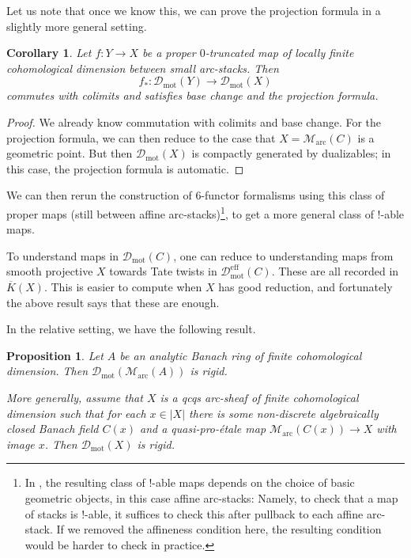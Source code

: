 \documentclass[11pt]{amsart}
\numberwithin{equation}{section}
\numberwithin{theorem}{section}
\newtheorem{corollary}[theorem]{Corollary}
\newtheorem{proposition}[theorem]{Proposition}
\theoremstyle{definition}
\begin{document}
Let us note that once we know this, we can prove the projection formula in a slightly more general setting.

\begin{corollary}\label{cor:generalprojectionformula} Let $f: Y\to X$ be a proper $0$-truncated map of locally finite cohomological dimension between small arc-stacks. Then
\[
f_\ast: \mathcal D_{\mathrm{mot}}(Y)\to \mathcal D_{\mathrm{mot}}(X)
\]
commutes with colimits and satisfies base change and the projection formula.
\end{corollary}

\begin{proof} We already know commutation with colimits and base change. For the projection formula, we can then reduce to the case that $X=\mathcal M_{\mathrm{arc}}(C)$ is a geometric point. But then $\mathcal D_{\mathrm{mot}}(X)$ is compactly generated by dualizables; in this case, the projection formula is automatic.
\end{proof}

We can then rerun the construction of $6$-functor formalisms using this class of proper maps (still between affine arc-stacks)\footnote{In \cite[Theorem 3.4.11]{HeyerMann}, the resulting class of $!$-able maps depends on the choice of basic geometric objects, in this case affine arc-stacks: Namely, to check that a map of stacks is $!$-able, it suffices to check this after pullback to each affine arc-stack. If we removed the affineness condition here, the resulting condition would be harder to check in practice.}, to get a more general class of $!$-able maps.

To understand maps in $\mathcal D_{\mathrm{mot}}(C)$, one can reduce to understanding maps from smooth projective $X$ towards Tate twists in $\mathcal D_{\mathrm{mot}}^{\mathrm{eff}}(C)$. These are all recorded in $\overline{K}(X)$. This is easier to compute when $X$ has good reduction, and fortunately the above result says that these are enough.

In the relative setting, we have the following result.

\begin{proposition}\label{prop:rigidity} Let $A$ be an analytic Banach ring of finite cohomological dimension. Then $\mathcal D_{\mathrm{mot}}(\mathcal M_{\mathrm{arc}}(A))$ is rigid.

More generally, assume that $X$ is a qcqs arc-sheaf of finite cohomological dimension such that for each $x\in |X|$ there is some non-discrete algebraically closed Banach field $C(x)$ and a quasi-pro-\'etale map $\mathcal M_{\mathrm{arc}}(C(x))\to X$ with image $x$. Then $\mathcal D_{\mathrm{mot}}(X)$ is rigid.
\end{proposition}
\end{document}
